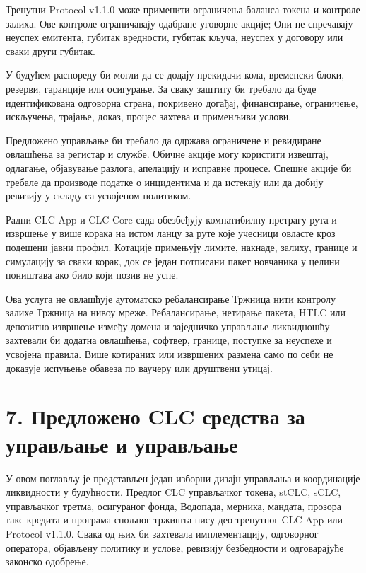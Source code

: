 \documentclass[11pt]{article}
\begin{document}
Тренутни Protocol v1.1.0 може применити ограничења баланса токена и контроле залиха. Ове контроле ограничавају одабране уговорне акције; Они не спречавају неуспех емитента, губитак вредности, губитак кључа, неуспех у договору или сваки други губитак.

У будућем распореду би могли да се додају прекидачи кола, временски блоки, резерви, гаранције или осигурање. За сваку заштиту би требало да буде идентификована одговорна страна, покривено догађај, финансирање, ограничење, искључења, трајање, доказ, процес захтева и применљиви услови.

Предложено управљање би требало да одржава ограничене и ревидиране овлашћења за регистар и службе. Обичне акције могу користити извештај, одлагање, објавување разлога, апелацију и исправне процесе. Спешне акције би требале да производе податке о инцидентима и да истекају или да добију ревизију у складу са усвојеном политиком.

Радни CLC App и CLC Core сада обезбеђују компатибилну претрагу рута и извршење у више корака на истом ланцу за руте које учесници овласте кроз подешени јавни профил. Котације примењују лимите, накнаде, залиху, границе и симулацију за сваки корак, док се један потписани пакет новчаника у целини поништава ако било који позив не успе.

Ова услуга не овлашћује аутоматско ребалансирање Тржница нити контролу залихе Тржница на нивоу мреже. Ребалансирање, нетирање пакета, HTLC или депозитно извршење између домена и заједничко управљање ликвидношћу захтевали би додатна овлашћења, софтвер, границе, поступке за неуспехе и усвојена правила. Више котираних или извршених размена само по себи не доказује испуњење обавеза по ваучеру или друштвени утицај.


\section*{7. Предложено CLC средства за управљање и управљање}

У овом поглављу је представљен један изборни дизајн управљања и координације ликвидности у будућности. Предлог CLC управљачког токена, stCLC, sCLC, управљачког третма, осигураног фонда, Водопада, мерника, мандата, прозора такс-кредита и програма спољног тржишта нису део тренутног CLC App или Protocol v1.1.0. Свака од њих би захтевала имплементацију, одговорног оператора, објављену политику и услове, ревизију безбедности и одговарајуће законско одобрење.
\end{document}
